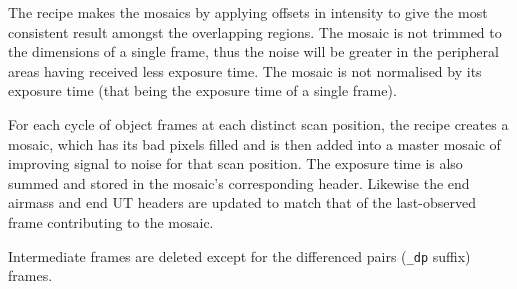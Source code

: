 \documentclass[twoside,11pt,nolof]{starlink}
\begin{document}
{{{         \sstitem
         The recipe makes the mosaics by applying offsets in intensity
         to give the most consistent result amongst the overlapping regions.
         The mosaic is not trimmed to the dimensions of a single frame, thus
         the noise will be greater in the peripheral areas having received
         less exposure time.  The mosaic is not normalised by its exposure
         time (that being the exposure time of a single frame).

         \sstitem
         For each cycle of object frames at each distinct scan position,
         the recipe creates a mosaic, which has its bad pixels filled and is
         then added into a master mosaic of improving signal to noise for
         that scan position.  The exposure time is also summed and stored in
         the mosaic's corresponding header.  Likewise the end airmass and end
         UT headers are updated to match that of the last-observed frame
         contributing to the mosaic.

         \sstitem
         Intermediate frames are deleted except for the differenced pairs
         ({\tt\_dp} suffix) frames.
      }
   }
   \sstimplementationstatus{
      \sstitemlist{

}}}
\end{document}
